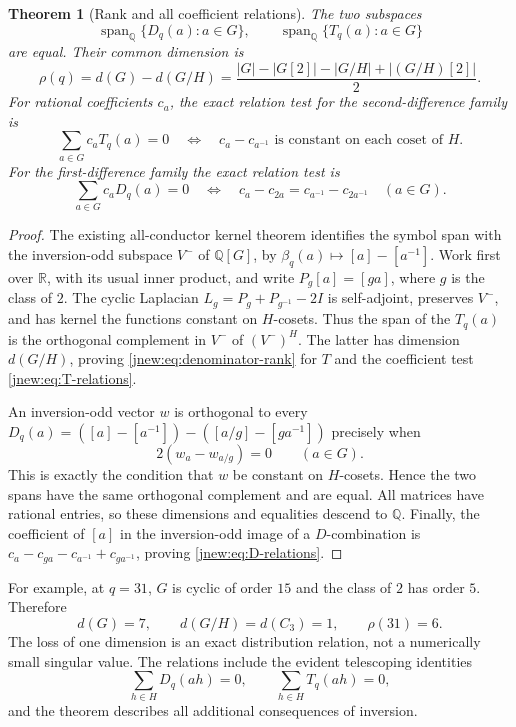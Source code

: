 \documentclass[11pt,a4paper]{article}
\newtheorem{theorem}{Theorem}[section]
\theoremstyle{definition}
\theoremstyle{remark}
\numberwithin{equation}{section}
\begin{document}
\begin{theorem}[Rank and all coefficient relations]
\label{jnew:thm:denominator-rank}
The two subspaces
\[
 \operatorname{span}_{\mathbb Q}\{D_q(a):a\in G\},
 \qquad
 \operatorname{span}_{\mathbb Q}\{T_q(a):a\in G\}
\]
are equal. Their common dimension is
\begin{equation}\label{jnew:eq:denominator-rank}
 \boxed{\displaystyle\rho(q)=d(G)-d(G/H)
 =\frac{|G|-|G[2]|-|G/H|+|(G/H)[2]|}{2}.}
\end{equation}
For rational coefficients $c_a$, the exact relation test for the
second-difference family is
\begin{equation}\label{jnew:eq:T-relations}
 \sum_{a\in G}c_aT_q(a)=0
 \quad\Longleftrightarrow\quad
 c_a-c_{a^{-1}}\text{ is constant on each coset of }H.
\end{equation}
For the first-difference family the exact relation test is
\begin{equation}\label{jnew:eq:D-relations}
 \sum_{a\in G}c_aD_q(a)=0
 \quad\Longleftrightarrow\quad
 c_a-c_{2a}=c_{a^{-1}}-c_{2a^{-1}}\quad(a\in G).
\end{equation}
\end{theorem}
\begin{proof}
The existing all-conductor kernel theorem identifies the symbol span
with the inversion-odd subspace $V^-$ of $\mathbb Q[G]$, by
$\beta_q(a)\mapsto[a]-[a^{-1}]$. Work first over $\mathbb R$, with
its usual inner product, and write $P_g[a]=[ga]$, where $g$ is the
class of $2$. The cyclic Laplacian
$L_g=P_g+P_{g^{-1}}-2I$ is self-adjoint, preserves $V^-$, and has
kernel the functions constant on $H$-cosets. Thus the span of the
$T_q(a)$ is the orthogonal complement in $V^-$ of
$(V^-)^H$. The latter has dimension $d(G/H)$, proving
\eqref{jnew:eq:denominator-rank} for $T$ and the coefficient test
\eqref{jnew:eq:T-relations}.

An inversion-odd vector $w$ is orthogonal to every
$D_q(a)=([a]-[a^{-1}])-([a/g]-[ga^{-1}])$ precisely when
\[
 2(w_a-w_{a/g})=0\qquad(a\in G).
\]
This is exactly the condition that $w$ be constant on $H$-cosets.
Hence the two spans have the same orthogonal complement and are
equal. All matrices have rational entries, so these dimensions and
equalities descend to $\mathbb Q$. Finally, the coefficient of
$[a]$ in the inversion-odd image of a $D$-combination is
$c_a-c_{ga}-c_{a^{-1}}+c_{ga^{-1}}$, proving
\eqref{jnew:eq:D-relations}.
\end{proof}

For example, at $q=31$, $G$ is cyclic of order $15$ and the class
of $2$ has order $5$. Therefore
\[
 d(G)=7,\qquad d(G/H)=d(C_3)=1,\qquad\rho(31)=6.
\]
The loss of one dimension is an exact distribution relation, not a
numerically small singular value. The relations include the evident
telescoping identities
\[
 \sum_{h\in H}D_q(ah)=0,\qquad
 \sum_{h\in H}T_q(ah)=0,
\]
and the theorem describes all additional consequences of inversion.
\end{document}
